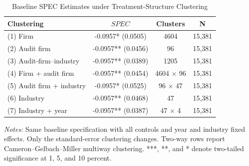 \begin{table}[H]
    \centering
    \caption{Baseline SPEC Estimates under Treatment-Structure Clustering}
    \label{tab:treatment_structure_clustering_spec}
    \begin{tabular}{lccc}
        \toprule
        Clustering & \(SPEC\) & Clusters & N \\
        \midrule
        (1) Firm & -0.0957* (0.0505) & 4604 & 15,381 \\
        (2) Audit firm & -0.0957** (0.0456) & 96 & 15,381 \\
        (3) Audit-firm–industry & -0.0957** (0.0389) & 1205 & 15,381 \\
        (4) Firm + audit firm & -0.0957** (0.0454) & 4604 × 96 & 15,381 \\
        (5) Audit firm + industry & -0.0957* (0.0525) & 96 × 47 & 15,381 \\
        (6) Industry & -0.0957** (0.0468) & 47 & 15,381 \\
        (7) Industry + year & -0.0957** (0.0387) & 47 × 4 & 15,381 \\
        \bottomrule
    \end{tabular}
    \par\smallskip
    \begin{minipage}{0.95\textwidth}
        \footnotesize
        \textit{Notes:} Same baseline specification with all controls and year and industry fixed effects. Only the standard-error clustering changes. Two-way rows report Cameron--Gelbach--Miller multiway clustering. ***, **, and * denote two-tailed significance at 1, 5, and 10 percent.
    \end{minipage}
\end{table}
